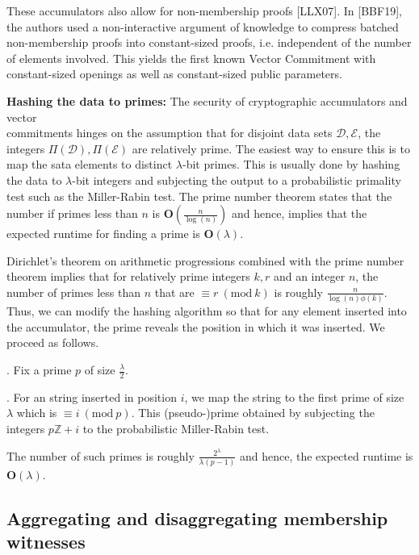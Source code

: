 \documentclass[11pt, lettersize, notitlepage, leqno, footskip=0.6cm]{article}
\newcommand{\bz}{\mathbb Z}
\newcommand{\mc}{\mathcal}
\newcommand{\mbf}{\mathbf}
\newcommand{\lam}{\lambda}
\newcommand{\vs}{\vspace{-0.15cm}}
\newcommand{\noin}{\noindent}
\newcommand{\Mod}[1]{\ (\mathrm{mod}\ #1)}
\numberwithin{equation}{section}
\begin{document}
These accumulators also allow for non-membership proofs [LLX07]. In [BBF19], the authors used a non-interactive argument of knowledge to compress batched non-membership proofs into constant-sized proofs, i.e. independent of the number of elements involved. This yields the first known Vector Commitment with constant-sized openings as well as  constant-sized public parameters.\vspace{0.1cm}

\noin \textbf{Hashing the data to primes:} The security of cryptographic accumulators and vector\\ commitments hinges on the assumption that for disjoint data sets $\mc{D},\mc{E}$, the integers $\Pi(\mc{D}), \Pi(\mc{E})$ are relatively prime. The easiest way to ensure this is to map the sata elements to distinct $\lam$-bit primes. This is usually done by hashing the data to $\lam$-bit integers and subjecting the output to a probabilistic primality test such as the Miller-Rabin test. The prime number theorem states that the number if primes less than $n$ is $\mbf{O}(\frac{n}{\log(n)})$ and hence, implies that the expected runtime for finding a prime is $\mbf{O}(\lam)$.

Dirichlet's theorem on arithmetic progressions combined with the prime number theorem implies that for relatively prime integers $k,r$ and an integer $n$, the number of primes less than $n$ that are $\equiv r\Mod{k}$ is roughly $\frac{n}{\log(n)\phi(k)}$. Thus, we can modify the hashing algorithm so that for any element inserted into the accumulator, the prime reveals the position in which it was inserted. We proceed as follows.\vspace{0.1cm}

\noin 1. Fix a prime $p$ of size $\frac{\lam}{2}$. 

\noin 2. For an string inserted in position $i$, we map the string to the first prime of size $\lam$ which is $\equiv i\Mod{p}$. This (pseudo-)prime obtained by subjecting the integers $p\bz+i$ to the probabilistic Miller-Rabin test. \vspace{0.1cm}

The number of such primes is roughly \vs $\frac{2^{\lam}}{\lam (p-1)}$ and hence, the expected runtime is $\mbf{O}(\lam)$.






\subsection{\fontsize{11}{11} Aggregating and disaggregating membership witnesses}
\end{document}
